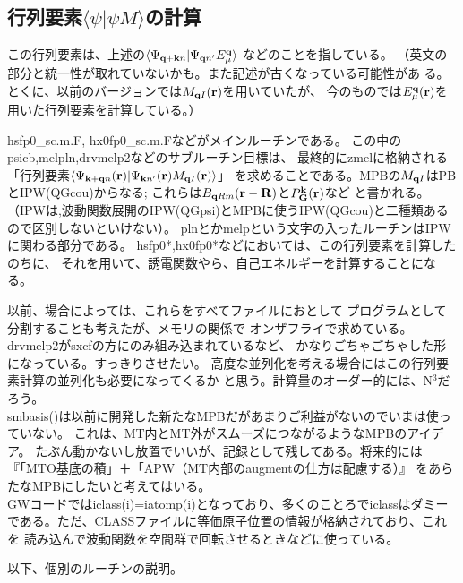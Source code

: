\documentclass[twocolumn,showpacs,preprintnumbers,amsmath,amssymb,floatfix]{revtex4-1}
\newcommand{\bfq}{{\bf q}}
\newcommand{\bfk}{{\bf k}}
\newcommand{\bfr}{{\bf r}}
\newcommand{\bfR}{{\bf R}}
\def\Psikqn{{\Psi_{{\bf k}+{\bf q} n}}}
\begin{document}
\begin{widetext}
\subsection{行列要素$\langle \psi |\psi M \rangle$の計算}
この行列要素は、上述の$\langle \Psi_{{\bf q+k}n} |\Psi_{{\bf q}n'} E^{\bf q}_\mu  \rangle$
などのことを指している。
（英文の部分と統一性が取れていないかも。また記述が古くなっている可能性があ
る。とくに、以前のバージョンでは$M_{{\bf q}I}(\bfr)$を用いていたが、
今のものでは$E^{\bf q}_\mu (\bfr)$を用いた行列要素を計算している。）

hsfp0\_sc.m.F, hx0fp0\_sc.m.Fなどがメインルーチンである。
この中のpsicb,melpln,drvmelp2などのサブルーチン目標は、
最終的にzmelに格納される
「行列要素$\langle\Psikqn(\bfr)|\Psi_{\bfk n'}(\bfr) M_{{\bf q}I}(\bfr)\rangle$」
を求めることである。MPBの$M_{{\bf q}I}$はPBとIPW(QGcou)からなる;
これらは$B_{\bfq Rm}(\bfr-\bfR)$と$P^{\bf k}_{\bf G}({\bf r})$など
と書かれる。（IPWは,波動関数展開のIPW(QGpsi)とMPBに使うIPW(QGcou)と二種類あるので区別しないといけない）。
plnとかmelpという文字の入ったルーチンはIPWに関わる部分である。
hsfp0*,hx0fp0*などにおいては、この行列要素を計算したのちに、
それを用いて、誘電関数やら、自己エネルギーを計算することになる。

以前、場合によっては、これらをすべてファイルにおとして
プログラムとして分割することも考えたが、メモリの関係で
オンザフライで求めている。drvmelp2がsxcfの方にのみ組み込まれているなど、
かなりごちゃごちゃした形になっている。すっきりさせたい。
高度な並列化を考える場合にはこの行列要素計算の並列化も必要になってくるか
と思う。計算量のオーダー的には、N$^3$だろう。\\

smbasis()は以前に開発した新たなMPBだがあまりご利益がないのでいまは使っていない。
これは、MT内とMT外がスムーズにつながるようなMPBのアイデア。
たぶん動かないし放置でいいが、記録として残してある。将来的には
『「MTO基底の積」＋「APW（MT内部のaugmentの仕方は配慮する）』
をあらたなMPBにしたいと考えてはいる。\\

GWコードではiclass(i)=iatomp(i)となっており、多くのことろでiclassはダミー
である。ただ、CLASSファイルに等価原子位置の情報が格納されており、これを
読み込んで波動関数を空間群で回転させるときなどに使っている。

以下、個別のルーチンの説明。\\



\end{widetext}
\end{document}
